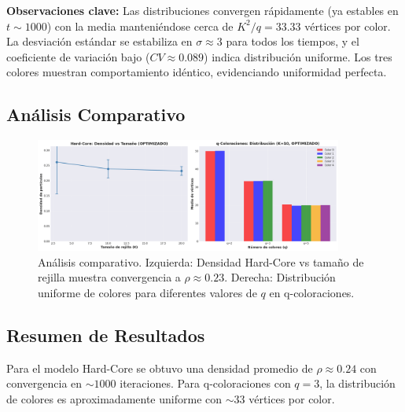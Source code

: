 \textbf{Observaciones clave:} Las distribuciones convergen rápidamente (ya estables en $t \sim 1000$) con la media manteniéndose cerca de $K^2/q = 33.33$ vértices por color. La desviación estándar se estabiliza en $\sigma \approx 3$ para todos los tiempos, y el coeficiente de variación bajo ($CV \approx 0.089$) indica distribución uniforme. Los tres colores muestran comportamiento idéntico, evidenciando uniformidad perfecta.

\subsection{Análisis Comparativo}

\begin{figure}[H]
\centering
\includegraphics[width=0.9\textwidth]{../images/comparativo_general.png}
\caption{Análisis comparativo. Izquierda: Densidad Hard-Core vs tamaño de rejilla muestra convergencia a $\rho \approx 0.23$. Derecha: Distribución uniforme de colores para diferentes valores de $q$ en q-coloraciones.}
\end{figure}

\subsection{Resumen de Resultados}

Para el modelo Hard-Core se obtuvo una densidad promedio de $\rho \approx 0.24$ con convergencia en $\sim 1000$ iteraciones. Para q-coloraciones con $q=3$, la distribución de colores es aproximadamente uniforme con $\sim 33$ vértices por color. 
